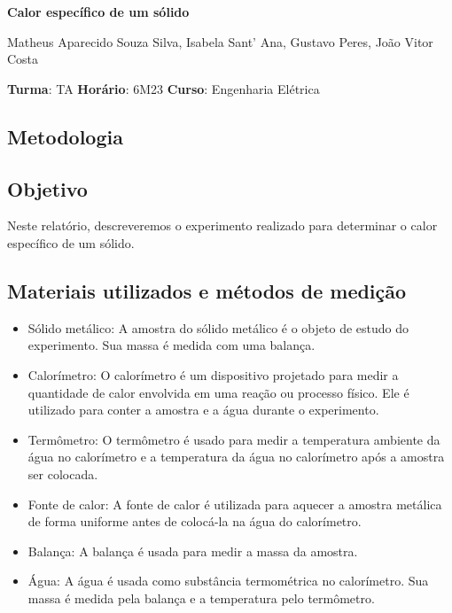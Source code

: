 \documentclass{article}
\begin{document}
\begin{center}
    \huge
    \textbf{Calor específico de um sólido}
    \normalsize
    \vspace{10pt}

    Matheus Aparecido Souza Silva, Isabela Sant' Ana, Gustavo Peres, João Vitor Costa
    \vspace{5pt}

    \textbf{Turma}: TA \textbf{Horário}: 6M23 \textbf{Curso}: Engenharia Elétrica
\end{center}

\begin{multicols}{2}

\section{Metodologia}

\subsection{Objetivo}

Neste relatório, descreveremos o experimento realizado para determinar o calor específico de um sólido.

\subsection{Materiais utilizados e métodos de medição}

\begin{itemize}
    \item Sólido metálico: A amostra do sólido metálico é o objeto de estudo do experimento. Sua massa é medida com uma balança.
    \item Calorímetro: O calorímetro é um dispositivo projetado para medir a quantidade de calor envolvida em uma reação ou processo físico. Ele é utilizado para conter a amostra e a água durante o experimento.
    \item Termômetro: O termômetro é usado para medir a temperatura ambiente da água no calorímetro e a temperatura da água no calorímetro após a amostra ser colocada.
    \item Fonte de calor: A fonte de calor é utilizada para aquecer a amostra metálica de forma uniforme antes de colocá-la na água do calorímetro.
    \item Balança: A balança é usada para medir a massa da amostra.
    \item Água: A água é usada como substância termométrica no calorímetro. Sua massa é medida pela balança e a temperatura pelo termômetro.
\end{itemize}


\end{multicols}
\end{document}
